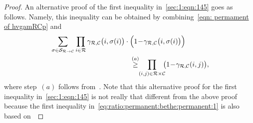\documentclass[journal,lettersize,twocolumn]{IEEEtran} %
\newcommand{\set}[1]{\mathcal{#1}}
\newcommand{\setC}{\set{C}}
\newcommand{\setR}{\set{R}}
\newcommand{\setS}{\set{S}}
\newcommand{\gamRCp}{\gamma_{\setR,\setC}}
\begin{document}
\begin{proof}
  An alternative proof of the first inequality in~\eqref{sec:1:eqn:145} goes
  as follows. Namely, this inequality can be obtained by combining~\eqref{eqn:
    permament of hvgamRCp} and
  \begin{align*}
    \hspace{4cm}&\hspace{-4cm}
    \sum_{\sigma \in \setS_{\setR \to \setC}}
      \prod_{i \in \setR} 
        \gamRCp\bigl(i,\sigma(i)\bigr)
        \cdot 
        \Bigl( 1 \! - \! \gamRCp\bigl(i,\sigma(i) \bigr) \Bigr) \\
      &\overset{(a)}{\geq}
         \!\! \prod_{(i,j) \in \setR \times \setC} \!\!
           \bigl( 1 \! - \! \gamRCp(i,j) \bigr),
  \end{align*}
  where step~$(a)$ follows from~\cite[Corollary~1c of
  Theorem~1]{Schrijver1998}. Note that this alternative proof for the first
  inequality in~\eqref{sec:1:eqn:145} is not really that different from the
  above proof because the first inequality
  in~\eqref{eq:ratio:permanent:bethe:permanent:1} is also based
  on~\cite[Corollary~1c of Theorem~1]{Schrijver1998}
\end{proof}

%
\end{document}

